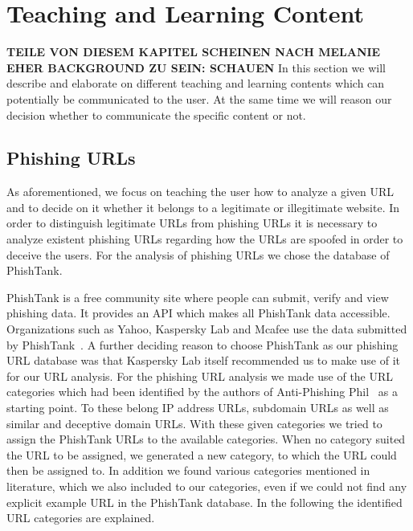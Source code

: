 \section{Teaching and Learning Content}

\textbf{TEILE VON DIESEM KAPITEL SCHEINEN NACH MELANIE EHER BACKGROUND ZU SEIN: SCHAUEN}
In this section we will describe and elaborate on different teaching and learning contents which can potentially be communicated to the user.
 At the same time we will reason our decision whether to communicate the specific content or not.

\subsection{Phishing URLs}
As aforementioned, we focus on teaching the user how to analyze a given URL and to decide on it whether it belongs to a legitimate or illegitimate website.
 In order to distinguish legitimate URLs from phishing URLs it is necessary to analyze existent phishing URLs regarding how the URLs are spoofed in order to deceive the users.
 For the analysis of phishing URLs we chose the database of PhishTank.

PhishTank is a free community site where people can submit, verify and view phishing data.
 It provides an API which makes all PhishTank data accessible.
 Organizations such as Yahoo, Kaspersky Lab and Mcafee use the data submitted by PhishTank~\cite{phishtank}. A further deciding reason to choose PhishTank as our phishing URL database was that Kaspersky Lab itself recommended us to make use of it for our URL analysis.
 For the phishing URL analysis we made use of the URL categories which had been identified by the authors of Anti-Phishing Phil~\cite{sheng2007antiphishingphil} as a starting point.
 To these belong IP address URLs, subdomain URLs as well as similar and deceptive domain URLs.
 With these given categories we tried to assign the PhishTank URLs to the available categories.
 When no category suited the URL to be assigned, we generated a new category, to which the URL could then be assigned to.
 In addition we found various categories mentioned in literature, which we also included to our categories, even if we could not find any explicit example URL in the PhishTank database.
 In the following the identified URL categories are explained.



